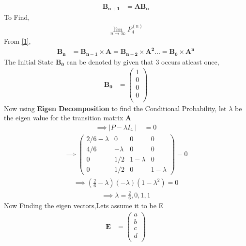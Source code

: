 \documentclass[journal,12pt,onecolumn]{IEEEtran}
\begin{document}
\begin{align}
   \label{1}
    \mathbf{B_{n+1}} &= \mathbf{A} \mathbf{B_{n}}
\end{align}
To Find,
\begin{align}
    \lim_{n \to \infty} P_{4}^{(n)}
\end{align}
From \eqref{1},
\begin{align}
    \mathbf{B_{n}} &= \mathbf{B_{n-1}} \times \mathbf{A} = \mathbf{B_{n-2}} \times \mathbf{A^2} \dots
    =\mathbf{B_{0}} \times \mathbf{A^n}
\end{align}
The Initial State $\mathbf{B_{0}}$ can be denoted by given that 3 occurs atleast once,
\begin{align}
\mathbf{B_{0}} &= 
\begin{pmatrix}
1 \\
0\\
0\\
0\\
\end{pmatrix}
\end{align}
Now using \textbf{Eigen Decomposition} to find the Conditional Probability,
let $\lambda$  be the eigen value for the transition matrix \textbf{A}\\
\begin{align}
 \implies   \mid P-\lambda {I_4} \mid &= 0  
 \end{align}
 \begin{align}
\implies  
\begin{pmatrix} 
2/6-\lambda  & 0 & 0 & 0\\[4pt]
4/6 & -\lambda & 0 & 0\\[4pt]
0 & 1/2 & 1-\lambda & 0\\[4pt]
0 & 1/2 & 0 & 1-\lambda
\end{pmatrix}
= 0
\end{align}
 \begin{align}
 \implies (\frac{2}{6} - \lambda)(-\lambda)(1 - \lambda^2) = 0
 \end{align}
 \begin{align}
 \implies \lambda = \frac{2}{6}, 0 , 1 , 1 
 \end{align}
 Now Finding the eigen vectors,Lets assume it to be E\\
\begin{align}
\mathbf{E} &= 
\begin{pmatrix}
a \\
b\\
c\\
d\\
\end{pmatrix}
\end{align}
\end{document}
